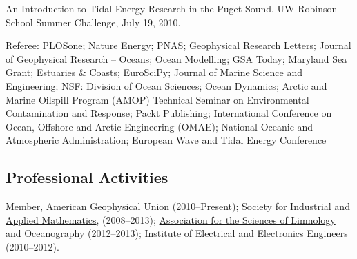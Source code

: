 \documentclass[10pt,letterpaper]{article}
\renewenvironment{itemize}{
  \begin{list}{}{
    \setlength{\leftmargin}{1.5em}
    \setlength{\itemsep}{0.25em}
    \setlength{\parskip}{0pt}
    \setlength{\parsep}{0.25em}
  }
}{
  \end{list}
}
\begin{document}
\begin{itemize}
	\item An Introduction to Tidal Energy Research in the Puget Sound. UW Robinson School Summer Challenge, July 19, 2010.
  \item Referee: PLOSone; Nature Energy; PNAS; Geophysical Research Letters; Journal of Geophysical Research -- Oceans; Ocean Modelling; GSA Today; Maryland Sea Grant; Estuaries \& Coasts; EuroSciPy; Journal of Marine Science and Engineering; NSF: Division of Ocean Sciences; Ocean Dynamics; Arctic and Marine Oilspill Program (AMOP) Technical Seminar on Environmental Contamination and Response; Packt Publishing; International Conference on Ocean, Offshore and Arctic Engineering (OMAE); National Oceanic and Atmospheric Administration; European Wave and Tidal Energy Conference
\end{itemize}


\subsection*{Professional Activities}

\begin{itemize}

\item Member, \href{http://www.agu.org/}{American Geophysical Union} (2010--Present); \href{http://www.siam.org/}{Society for Industrial and Applied Mathematics}, (2008--2013); \href{http://www.aslo.org/}{Association for the Sciences of Limnology and Oceanography} (2012--2013); \href{http://www.ieee.org/}{Institute of Electrical and Electronics Engineers} (2010--2012).

%

\end{itemize}
\end{document}
